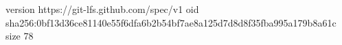 version https://git-lfs.github.com/spec/v1
oid sha256:0bf13d36ce81140e55f6dfa6b2b54bf7ae8a125d7d8d8f35fba995a179b8a61c
size 78
